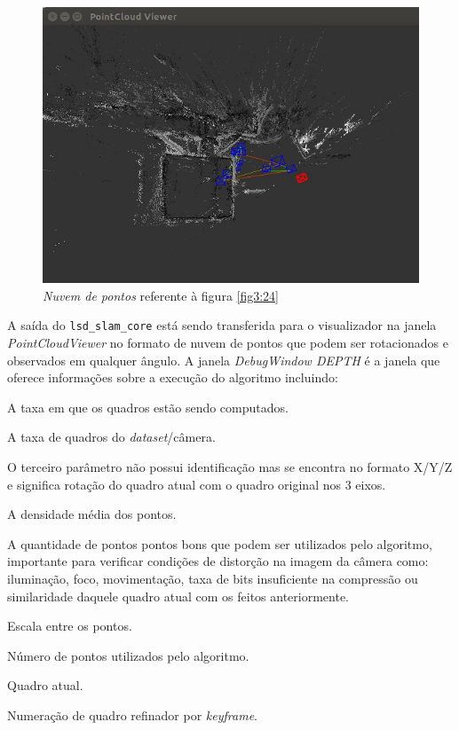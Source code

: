 \begin{figure}[H]
	\centering
		\includegraphics[width= \textwidth]{Imagens/figura3-25.jpg}
	\caption{\textit{Nuvem de pontos} referente à figura \ref{fig3:24}}
	\label{fig3:25}
\end{figure}

A saída do \texttt{lsd\_slam\_core} está sendo transferida para o visualizador na janela \textit{PointCloudViewer} no formato de nuvem de pontos que podem ser rotacionados e observados em qualquer ângulo. A janela \textit{DebugWindow DEPTH} é a janela que oferece informações sobre a execução do algoritmo incluindo:

\begin{description}
	\item[Map upd :]{A taxa em que os quadros estão sendo computados.}
	\item[Trk :]{A taxa de quadros do \textit{dataset}/câmera.}
	\item[X/Y/Z :]{O terceiro parâmetro não possui identificação mas se encontra no formato X/Y/Z e significa rotação do quadro atual com o quadro original nos 3 eixos.}
	\item[Dens X\% :]{A densidade média dos pontos.}
	\item[Good X\% :]{ A quantidade de pontos pontos bons que podem ser utilizados pelo algoritmo, importante para verificar condições de distorção na imagem da câmera como: iluminação, foco, movimentação, taxa de bits insuficiente na compressão ou similaridade daquele quadro atual com os feitos anteriormente.}
	\item[Scale X\% :]{Escala entre os pontos.}
	\item{Número de pontos utilizados pelo algoritmo.}
	\item{Quadro atual.}
	\item{Numeração de quadro refinador por \textit{keyframe}.}
\end{description}

